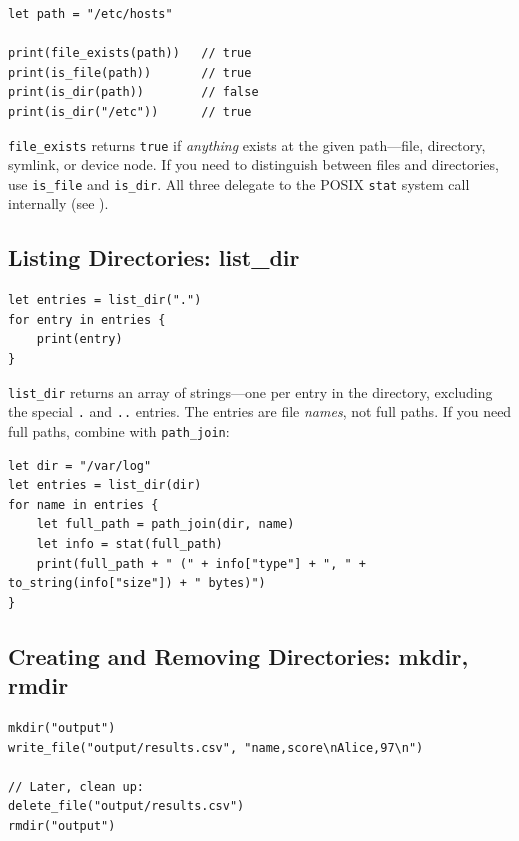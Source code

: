 \begin{lstlisting}[language=Lattice, caption={Checking existence and type}]
let path = "/etc/hosts"

print(file_exists(path))   // true
print(is_file(path))       // true
print(is_dir(path))        // false
print(is_dir("/etc"))      // true
\end{lstlisting}

\lstinline|file_exists| returns \lstinline|true| if \emph{anything} exists at
the given path---file, directory, symlink, or device node. If you need to
distinguish between files and directories, use \lstinline|is_file| and
\lstinline|is_dir|. All three delegate to the POSIX \texttt{stat} system call
internally (see ).

\subsection{Listing Directories: list\_dir}\label{sec:list-dir}

\begin{lstlisting}[language=Lattice, caption={Listing directory entries}]
let entries = list_dir(".")
for entry in entries {
    print(entry)
}
\end{lstlisting}

\lstinline|list_dir| returns an array of strings---one per entry in the
directory, excluding the special \texttt{.} and \texttt{..} entries. The
entries are file \emph{names}, not full paths. If you need full paths, combine
with \lstinline|path_join|:

\begin{lstlisting}[language=Lattice, caption={Building full paths from directory entries}]
let dir = "/var/log"
let entries = list_dir(dir)
for name in entries {
    let full_path = path_join(dir, name)
    let info = stat(full_path)
    print(full_path + " (" + info["type"] + ", " + to_string(info["size"]) + " bytes)")
}
\end{lstlisting}

\subsection{Creating and Removing Directories: mkdir, rmdir}
\label{sec:mkdir-rmdir}

\begin{lstlisting}[language=Lattice, caption={Creating and removing directories}]
mkdir("output")
write_file("output/results.csv", "name,score\nAlice,97\n")

// Later, clean up:
delete_file("output/results.csv")
rmdir("output")
\end{lstlisting}

